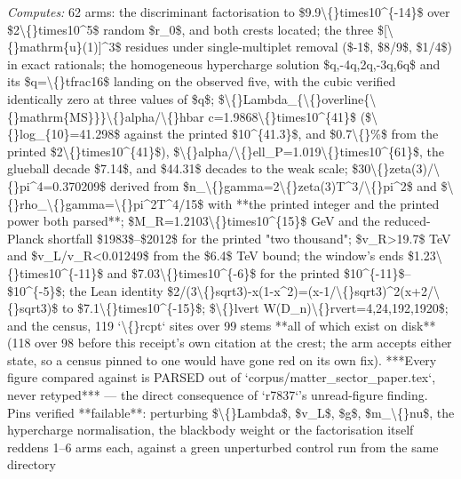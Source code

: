 \begin{description}
\emph{Computes:} 62 arms: the discriminant factorisation to \$9.9\textbackslash\{\}times10\textasciicircum{}\{-14\}\$ over \$2\textbackslash\{\}times10\textasciicircum{}5\$ random \$r\_0\$, and both crests located; the three \$[\textbackslash\{\}mathrm\{u\}(1)]\textasciicircum{}3\$ residues under single-multiplet removal (\$-1\$, \$8/9\$, \$1/4\$) in exact rationals; the homogeneous hypercharge solution \$q,-4q,2q,-3q,6q\$ and its \$q=\textbackslash\{\}tfrac16\$ landing on the observed five, with the cubic verified identically zero at three values of \$q\$; \$\textbackslash\{\}Lambda\_\{\textbackslash\{\}overline\{\textbackslash\{\}mathrm\{MS\}\}\}\textbackslash\{\}alpha/\textbackslash\{\}hbar c=1.9868\textbackslash\{\}times10\textasciicircum{}\{41\}\$ (\$\textbackslash\{\}log\_\{10\}=41.298\$ against the printed \$10\textasciicircum{}\{41.3\}\$, and \$0.7\textbackslash\{\}\%\$ from the printed \$2\textbackslash\{\}times10\textasciicircum{}\{41\}\$), \$\textbackslash\{\}alpha/\textbackslash\{\}ell\_P=1.019\textbackslash\{\}times10\textasciicircum{}\{61\}\$, the glueball decade \$7.14\$, and \$44.31\$ decades to the weak scale; \$30\textbackslash\{\}zeta(3)/\textbackslash\{\}pi\textasciicircum{}4=0.370209\$ derived from \$n\_\textbackslash\{\}gamma=2\textbackslash\{\}zeta(3)T\textasciicircum{}3/\textbackslash\{\}pi\textasciicircum{}2\$ and \$\textbackslash\{\}rho\_\textbackslash\{\}gamma=\textbackslash\{\}pi\textasciicircum{}2T\textasciicircum{}4/15\$ with **the printed integer and the printed power both parsed**; \$M\_R=1.2103\textbackslash\{\}times10\textasciicircum{}\{15\}\$ GeV and the reduced-Planck shortfall \$1983\$--\$2012\$ for the printed "two thousand"; \$v\_R>19.7\$ TeV and \$v\_L/v\_R<0.01249\$ from the \$6.4\$ TeV bound; the window's ends \$1.23\textbackslash\{\}times10\textasciicircum{}\{-11\}\$ and \$7.03\textbackslash\{\}times10\textasciicircum{}\{-6\}\$ for the printed \$10\textasciicircum{}\{-11\}\$--\$10\textasciicircum{}\{-5\}\$; the Lean identity \$2/(3\textbackslash\{\}sqrt3)-x(1-x\textasciicircum{}2)=(x-1/\textbackslash\{\}sqrt3)\textasciicircum{}2(x+2/\textbackslash\{\}sqrt3)\$ to \$7.1\textbackslash\{\}times10\textasciicircum{}\{-15\}\$; \$\textbackslash\{\}lvert W(D\_n)\textbackslash\{\}rvert=4,24,192,1920\$; and the census, 119 `\textbackslash\{\}rcpt` sites over 99 stems **all of which exist on disk** (118 over 98 before this receipt's own citation at the crest; the arm accepts either state, so a census pinned to one would have gone red on its own fix). ***Every figure compared against is PARSED out of `corpus/matter\_sector\_paper.tex`, never retyped*** --- the direct consequence of `r7837`'s unread-figure finding. Pins verified **failable**: perturbing \$\textbackslash\{\}Lambda\$, \$v\_L\$, \$g\$, \$m\_\textbackslash\{\}nu\$, the hypercharge normalisation, the blackbody weight or the factorisation itself reddens 1--6 arms each, against a green unperturbed control run from the same directory

\end{description}
